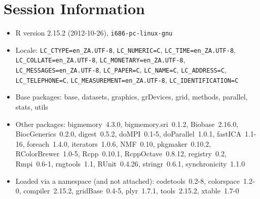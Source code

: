 \documentclass[10pt]{article}
\begin{document}
\section*{Session Information}
\begin{itemize}\raggedright
  \item R version 2.15.2 (2012-10-26), \verb|i686-pc-linux-gnu|
  \item Locale: \verb|LC_CTYPE=en_ZA.UTF-8|, \verb|LC_NUMERIC=C|, \verb|LC_TIME=en_ZA.UTF-8|, \verb|LC_COLLATE=en_ZA.UTF-8|, \verb|LC_MONETARY=en_ZA.UTF-8|, \verb|LC_MESSAGES=en_ZA.UTF-8|, \verb|LC_PAPER=C|, \verb|LC_NAME=C|, \verb|LC_ADDRESS=C|, \verb|LC_TELEPHONE=C|, \verb|LC_MEASUREMENT=en_ZA.UTF-8|, \verb|LC_IDENTIFICATION=C|
  \item Base packages: base, datasets, graphics, grDevices, grid,
    methods, parallel, stats, utils
  \item Other packages: bigmemory~4.3.0, bigmemory.sri~0.1.2,
    Biobase~2.16.0, BiocGenerics~0.2.0, digest~0.5.2, doMPI~0.1-5,
    doParallel~1.0.1, fastICA~1.1-16, foreach~1.4.0, iterators~1.0.6,
    NMF~0.10, pkgmaker~0.10.2, RColorBrewer~1.0-5, Rcpp~0.10.1,
    RcppOctave~0.8.12, registry~0.2, Rmpi~0.6-1, rngtools~1.1,
    RUnit~0.4.26, stringr~0.6.1, synchronicity~1.1.0
  \item Loaded via a namespace (and not attached): codetools~0.2-8,
    colorspace~1.2-0, compiler~2.15.2, gridBase~0.4-5, plyr~1.7.1,
    tools~2.15.2, xtable~1.7-0
\end{itemize}
\end{document}
